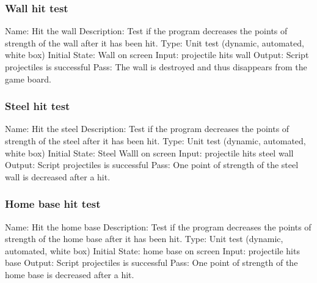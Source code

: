 \documentclass{article}
\begin{document}
\subsubsection{Wall hit test}
Name:  Hit the wall\newline
Description: Test if the program decreases the points of strength of the wall 
after it has been hit. \newline
Type: Unit test (dynamic, automated, white box) \newline
Initial State:  Wall on screen\newline
Input: projectile hits wall\newline
Output: Script projectiles is successful  \newline
Pass:  The wall is destroyed and thus disappears from the game board.
\newline

\subsubsection{Steel hit test}
Name:  Hit the steel\newline
Description: Test if the program decreases the points of strength of the steel 
after it has been hit. \newline
Type: Unit test (dynamic, automated, white box) \newline
Initial State:  Steel Walll on screen\newline
Input: projectile hits steel wall\newline
Output: Script projectiles is successful  \newline
Pass:  One point of strength of the steel wall is decreased after a hit. 
\newline

\subsubsection{Home base hit test}
Name:  Hit the home base\newline
Description: Test if the program decreases the points of strength of the home 
base after it has been hit. \newline
Type: Unit test (dynamic, automated, white box) \newline
Initial State:  home base on screen\newline
Input: projectile hits base\newline
Output: Script projectiles is successful  \newline
Pass:  One point of strength of the home base is decreased after a hit. 
\newline
\end{document}
